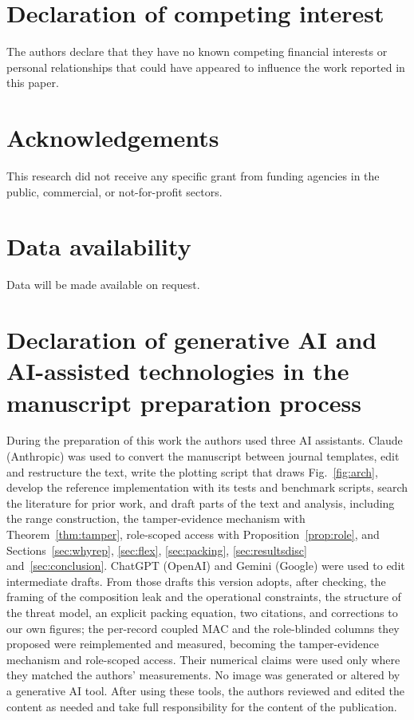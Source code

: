 \documentclass[a4paper,fleqn]{cas-sc}
\newif\ifanonymous
\begin{document}
\ifanonymous\else\printcredits\fi

\section*{Declaration of competing interest}
The authors declare that they have no known competing financial interests or
personal relationships that could have appeared to influence the work reported
in this paper.

\section*{Acknowledgements}
This research did not receive any specific grant from funding agencies in the
public, commercial, or not-for-profit sectors.

\section*{Data availability}
Data will be made available on request.

\section*{Declaration of generative AI and AI-assisted technologies in the
manuscript preparation process}
During the preparation of this work the authors used three AI assistants.
Claude (Anthropic) was used to convert the manuscript between journal
templates, edit and restructure the text, write the plotting script that draws
Fig.~\ref{fig:arch}, develop the reference implementation with its tests and
benchmark scripts, search the literature for prior work, and draft parts of
the text and analysis, including the range construction, the tamper-evidence
mechanism with Theorem~\ref{thm:tamper}, role-scoped access with
Proposition~\ref{prop:role}, and Sections~\ref{sec:whyrep}, \ref{sec:flex},
\ref{sec:packing}, \ref{sec:resultsdisc} and~\ref{sec:conclusion}. ChatGPT
(OpenAI) and Gemini (Google) were used to edit intermediate drafts. From
those drafts this version adopts, after checking, the framing of the
composition leak and the operational constraints, the structure of the threat
model, an explicit packing equation, two citations, and corrections to our
own figures; the per-record coupled MAC and the role-blinded columns they
proposed were reimplemented and measured, becoming the tamper-evidence
mechanism and role-scoped access. Their numerical claims were used only where
they matched the authors' measurements. No image
was generated or altered by a generative AI tool. After using these tools, the
authors reviewed and edited the content as needed and take full responsibility
for the content of the publication.



\end{document}
